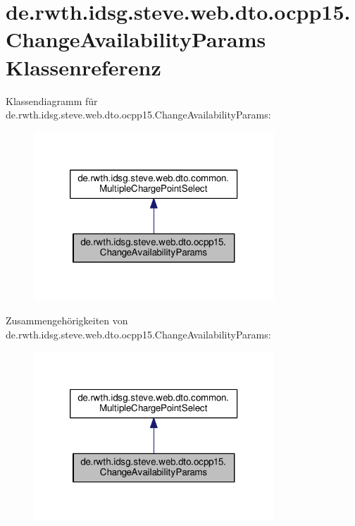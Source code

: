 \hypertarget{classde_1_1rwth_1_1idsg_1_1steve_1_1web_1_1dto_1_1ocpp15_1_1_change_availability_params}{\section{de.\-rwth.\-idsg.\-steve.\-web.\-dto.\-ocpp15.\-Change\-Availability\-Params Klassenreferenz}
\label{classde_1_1rwth_1_1idsg_1_1steve_1_1web_1_1dto_1_1ocpp15_1_1_change_availability_params}
}


Klassendiagramm für de.\-rwth.\-idsg.\-steve.\-web.\-dto.\-ocpp15.\-Change\-Availability\-Params\-:\nopagebreak
\begin{figure}[H]
\begin{center}
\leavevmode
\includegraphics[width=256pt]{classde_1_1rwth_1_1idsg_1_1steve_1_1web_1_1dto_1_1ocpp15_1_1_change_availability_params__inherit__graph}
\end{center}
\end{figure}


Zusammengehörigkeiten von de.\-rwth.\-idsg.\-steve.\-web.\-dto.\-ocpp15.\-Change\-Availability\-Params\-:\nopagebreak
\begin{figure}[H]
\begin{center}
\leavevmode
\includegraphics[width=256pt]{classde_1_1rwth_1_1idsg_1_1steve_1_1web_1_1dto_1_1ocpp15_1_1_change_availability_params__coll__graph}
\end{center}
\end{figure}

